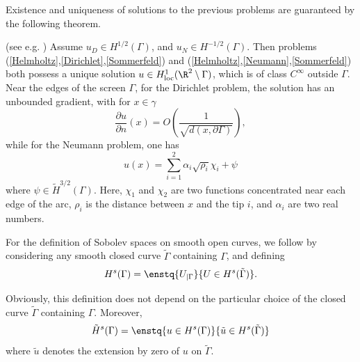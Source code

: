 \documentclass[a4paper]{article}
\begin{document}
	Existence and uniqueness of solutions to the previous problems are guaranteed by the following theorem.
	\begin{The}(see e.g. \cite{stephan1984augmented,wendland1990hypersingular,monch1996numerical}) Assume $u_D \in H^{1/2}(\Gamma)$, and $u_N \in H^{-1/2}(\Gamma)$. Then problems (\ref{Helmholtz},\ref{Dirichlet},\ref{Sommerfeld}) and (\ref{Helmholtz},\ref{Neumann},\ref{Sommerfeld}) both possess a unique solution $u \in H^1_\textup{loc}(\R^2 \setminus \Gamma)$, which is of class $C^{\infty}$ outside $\Gamma$. Near the edges of the screen $\Gamma$, for the Dirichlet problem, the solution has an unbounded gradient, with for $x\in \gamma$
		\[\dfrac{\partial u}{\partial n}(x) = O\left(\frac{1}{\sqrt{d(x,\partial \Gamma)}}\right),\]
		while for the Neumann problem, one has 
		\[u(x) = \sum_{i=1}^2 \alpha_i \sqrt{\rho_i}\chi_i + \psi\]
		where $\psi \in \tilde{H}^{3/2}(\Gamma)$. Here, $\chi_1$ and $\chi_2$ are two functions concentrated near each edge of the arc, $\rho_i$ is the distance between $x$ and the tip $i$, and $\alpha_i$ are two real numbers. 
	\end{The}
	
	For the definition of Sobolev spaces on smooth open curves, we follow
	\cite{mclean2000strongly} by considering any smooth closed curve $\tilde{\Gamma}$ containing $\Gamma$, and defining 
	\[H^s(\Gamma) = \enstq{U_{|\Gamma}}{ U \in H^s(\tilde{\Gamma}) }.\]
	
	Obviously, this definition does not depend on the particular choice of the closed curve $\tilde{\Gamma}$ containing $\Gamma$. Moreover,
	\[\tilde{H}^s(\Gamma) = \enstq{u \in H^s(\Gamma)}{\tilde{u} \in H^s(\tilde{\Gamma})}\]
	where $\tilde{u}$ denotes the extension by zero of $u$ on $\tilde{\Gamma}$.
	
\end{document}
